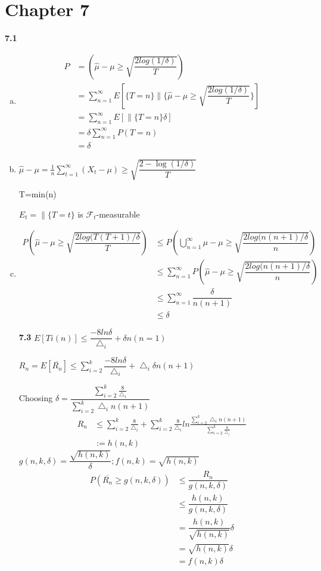 \chapter*{Chapter 7}
\label{sec:7}

\noindent\textbf{7.1}

    \begin{enumerate}[(a)]
    \item
    \begin{align*}
    P &=(\hat{\mu}-\mu\ge\sqrt{\dfrac{2log(1/\delta)}{T}})\\
    &=\sum^{\infty}_{n=1}E[\{T=n\}\|\{\hat{\mu}-\mu\ge\sqrt{\dfrac{2log(1/\delta)}{T}}\}]\\
    &=\sum^{\infty}_{n=1}E[\|\{T=n\}\delta]\\
    &=\delta\sum^{\infty}_{n=1}P(T=n)\\
    &=\delta
    \end{align*}

    \item
    $\hat{\mu}-\mu=\frac{1}{n}\sum^{\infty}_{t=1}(X_t-\mu)\ge\sqrt{\dfrac{2-\log(1/\delta)}{T}}$

    T=min(n)

    $E_t=\|\{T=t\}$ is $\mathcal{F}_t$-measurable

    \item
    \begin{align*}
    P(\hat{\mu}-\mu\ge\sqrt{\dfrac{2log(T(T+1)/\delta}{T}}) &\le P(\bigcup^{\infty}_{n=1}\hat{\mu}-\mu\ge\sqrt{\dfrac{2log(n(n+1)/\delta}{n}})\\
    &\le \sum^{\infty}_{n=1}P(\hat{\mu}-\mu\ge\sqrt{\dfrac{2log(n(n+1)/\delta}{n}})\\
    &\le \sum^{\infty}_{n=1} \dfrac{\delta}{n(n+1)}\\
    &\le \delta
    \end{align*}



\noindent\textbf{7.3}
    $E[Ti(n)]\le\dfrac{-8ln\delta}{\bigtriangleup_i}+\delta n(n=1)$


    $R_n=E[\overline{R_n}]\le\sum^{k}_{i=2}\dfrac{-8ln\delta}{\bigtriangleup_i}+\bigtriangleup_i\delta n(n+1)$


    Choosing
    $\delta=\dfrac{\sum^{k}_{i=2}\frac{8}{\bigtriangleup_i}}{\sum^{k}_{i=2}\bigtriangleup_i   n(n+1)}$
    \begin{align*}
    R_n &\le\sum^{k}_{i=2}\frac{8}{\bigtriangleup_i}+\sum^{k}_{i=2}\frac{8}{\bigtriangleup_i}ln\frac{\sum^{k}_{i=2}\bigtriangleup_i n(n+1)}{\sum^{k}_{i=2}\frac{8}{\bigtriangleup_i}}\\
    &:=h(n,k)
    \end{align*}
    $g(n,k,\delta)=\dfrac{\sqrt{h(n,k)}}{\delta};f(n,k)=\sqrt{h(n,k)}$
    \begin{align*}
    P(\overline{R_n}\ge g(n,k,\delta)) &\le\dfrac{R_n}{g(n,k,\delta)}\\
    &\le\dfrac{h(n,k)}{g(n,k,\delta)}\\
    &=\dfrac{h(n,k)}{\sqrt{h(n,k)}}\delta\\
    &=\sqrt{h(n,k)}\delta\\
    &=f(n,k)\delta
    \end{align*}



\end{enumerate}

